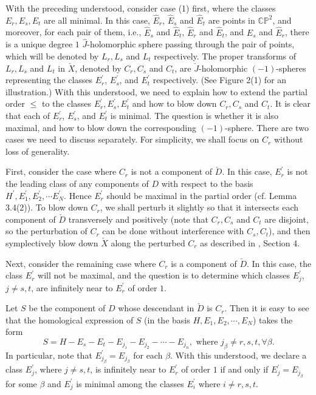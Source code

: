 \documentclass[11pt]{amsart}
\theoremstyle{plain}
\numberwithin{theorem}{section}
\theoremstyle{definition}
\newcommand{\C}{{\mathbb C}}
\renewcommand{\P}{{\mathbb P}}
\begin{document}
With the preceding understood, consider case (1) first, where the classes $E_r,E_s,E_t$ are all minimal. 
In this case, $\hat{E}_r$, $\hat{E}_s$ and $\hat{E}_t$ are points in $\C\P^2$, and moreover, for each pair of them,
i.e., $\hat{E}_s$ and $\hat{E}_t$, $\hat{E}_r$ and $\hat{E}_t$, and $\hat{E}_s$ and $\hat{E}_r$,
there is a unique degree $1$ $\hat{J}$-holomorphic sphere passing through the pair of points, which will be denoted 
by $L_r, L_s$ and $L_t$ respectively. The proper transforms of $L_r, L_s$ and $L_t$ in $\check{X}$,
denoted by $C_r, C_s$ and $C_t$, are $\check{J}$-holomorphic $(-1)$-spheres representing the classes $E_r^\prime$, $E_s^\prime$, and $E_t^\prime$ respectively. (See Figure 2(1) for an illustration.) With this understood, we need to explain how to extend the partial order $\leq$ to the classes $E_r^\prime,E_s^\prime,E_t^\prime$ and how to blow down $C_r, C_s$ and $C_t$. It is clear that each of $E_r^\prime$, $E_s^\prime$, and $E_t^\prime$ is minimal. The question is whether it is also maximal, and how to blow down the corresponding $(-1)$-sphere. There are two cases we need to discuss separately. For simplicity, we shall focus on $C_r$ without loss of generality.

First, consider the case where $C_r$ is not a component of $\check{D}$. In this case, $E_r^\prime$
is not the leading class of any components of $D$ with respect to the basis $H^\prime, E_1^\prime,E_2^\prime,\cdots E_N^\prime$. Hence $E_r^\prime$ should be maximal in the partial order (cf. Lemma 3.4(2)). To blow down $C_r$, we shall perturb it slightly so that it intersects each component of $\check{D}$ transversely and positively (note that $C_r, C_s$ and $C_t$ are disjoint, 
so the perturbation of $C_r$ can be done without interference with $C_s,C_t$), and then symplectively blow down $\check{X}$ along the perturbed $C_r$ as described in \cite{C1}, Section 4. 

Next, consider the remaining case where $C_r$ is a component of  $\check{D}$. In this case, the class
$E_r^\prime$ will not be maximal, and the question is to determine which classes $E_j^\prime$, $j\neq s,t$, are infinitely near to $E_r^\prime$ of order $1$. 

Let $S$ be the component of $D$ whose descendant in $\check{D}$ is $C_r$. Then it is easy to see that the homological expression of $S$ (in the basis $H,E_1,E_2,\cdots, E_N$) takes the form
$$
S=H-E_s-E_t-E_{j_1}-E_{j_2}-\cdots-E_{j_n}, \mbox{ where } j_\beta\neq r, s,t, \forall \beta.
$$
In particular, note that $E_{j_\beta}^\prime=E_{j_\beta}$ for each $\beta$. With this understood, we declare a class $E_j^\prime$, where $j\neq s,t$, is infinitely near to $E_r^\prime$ of order $1$ if and only if $E_j^\prime=E_{j_\beta}$ for some $\beta$ and $E_j^\prime$ is minimal among the classes $E_i^\prime$ where $i\neq r,s,t$. 
 
\end{document}
